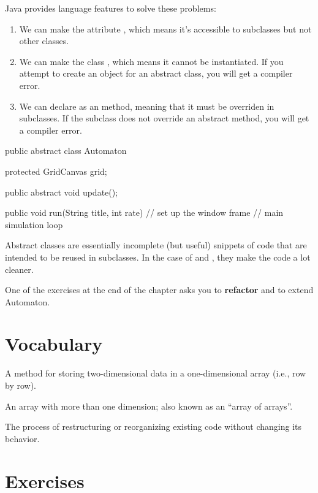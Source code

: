 Java provides language features to solve these problems:
\begin{enumerate}
\item We can make the  attribute , which means it's accessible to subclasses but not other classes.
\item We can make the class , which means it cannot be instantiated.
If you attempt to create an object for an abstract class, you will get a compiler error.
\item We can declare  as an  method, meaning that it must be overriden in subclasses.
If the subclass does not override an abstract method, you will get a compiler error.
\end{enumerate}

\begin{code}
public abstract class Automaton {
    protected GridCanvas grid;

    public abstract void update();

    public void run(String title, int rate) {
        // set up the window frame
        // main simulation loop
    }
}
\end{code}

Abstract classes are essentially incomplete (but useful) snippets of code that are intended to be reused in subclasses.
In the case of  and , they make the code a lot cleaner.

One of the exercises at the end of the chapter asks you to {\bf refactor}  and  to extend Automaton.


\section{Vocabulary}

\begin{description}

A method for storing two-dimensional data in a one-dimensional array (i.e., row by row).

An array with more than one dimension; also known as an ``array of arrays''.

The process of restructuring or reorganizing existing code without changing its behavior.

\end{description}


\section{Exercises}

